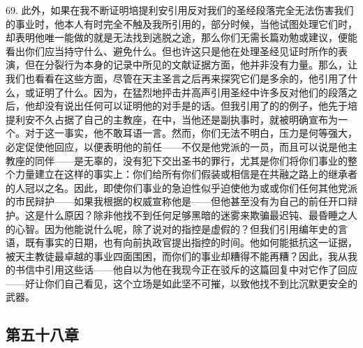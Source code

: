 69. 此外，如果在我不断证明培提利安引用反对我们的圣经段落完全无法伤害我们的事业时，他本人有时完全不触及我所引用的，部分时候，当他试图处理它们时，却表明他唯一能做的就是无法找到逃脱之途，那么你们无需长篇劝勉或建议，便能看出你们应当持守什么、避免什么。但也许这只是他在处理圣经见证时所作的表演，但在分裂行为本身的记录中所见的文献证据方面，他并非没有力量。那么，让我们也看看在这些方面，尽管在天主圣言之后再来探究它们是多余的，他引用了什么，或证明了什么。因为，在猛烈地抨击并高声引用圣经中许多反对他们的段落之后，他却没有说出任何可以证明他的对手是的话。但我引用了的的例子，他先于培提利安不久占据了自己的主教座，在中，当他还是副执事时，就被明确宣布为一个。对于这一事实，他不敢耳语一言。然而，你们无法不明白，压力是何等强大，必定促使他回应，以便表明他的前任——不仅是他党派的一员，而且可以说是他主教座的同伴——是无辜的，没有犯下交出圣书的罪行，尤其是你们将你们事业的整个力量建立在这样的事实上：你们给所有你们假装或相信是在共融之路上的继承者的人冠以之名。因此，即使你们事业的急迫性似乎迫使他为或或你们任何其他党派的市民辩护——如果我根据的权威宣称他是——但他甚至没有为自己的前任开口辩护。这是什么原因？除非他找不到任何足够黑暗的迷雾来欺骗最迟钝、最昏睡之人的心智。因为他能说什么呢，除了说对的指控是虚假的？但我们引用编年史的言语，既有事实的日期，也有向前执政官提出指控的时间。他如何能抵抗这一证据，被天主教徒最卓越的事业四面围困，而你们的事业却糟得不能再糟？因此，我从我的书信中引用这些话——他自以为他在我现今正在驳斥的这篇回复中对它作了回应——好让你们自己看见，这个立场是如此坚不可摧，以致他找不到比沉默更安全的武器。\par


\subsection{第五十八章}

